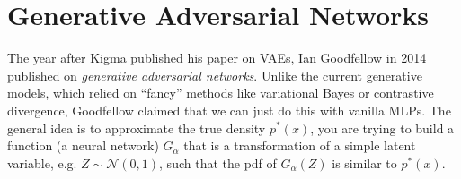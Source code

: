 \section{Generative Adversarial Networks} 

  The year after Kigma published his paper on VAEs, Ian Goodfellow in 2014 published \cite{gans} on \textit{generative adversarial networks}. Unlike the current generative models, which relied on ``fancy'' methods like variational Bayes or contrastive divergence, Goodfellow claimed that we can just do this with vanilla MLPs. The general idea is to approximate the true density $p^\ast (x)$, you are trying to build a function (a neural network) $G_\alpha$ that is a transformation of a simple latent variable, e.g. $Z \sim \mathcal{N}(0, 1)$, such that the pdf of $G_\alpha (Z)$ is similar to $p^\ast (x)$. 

